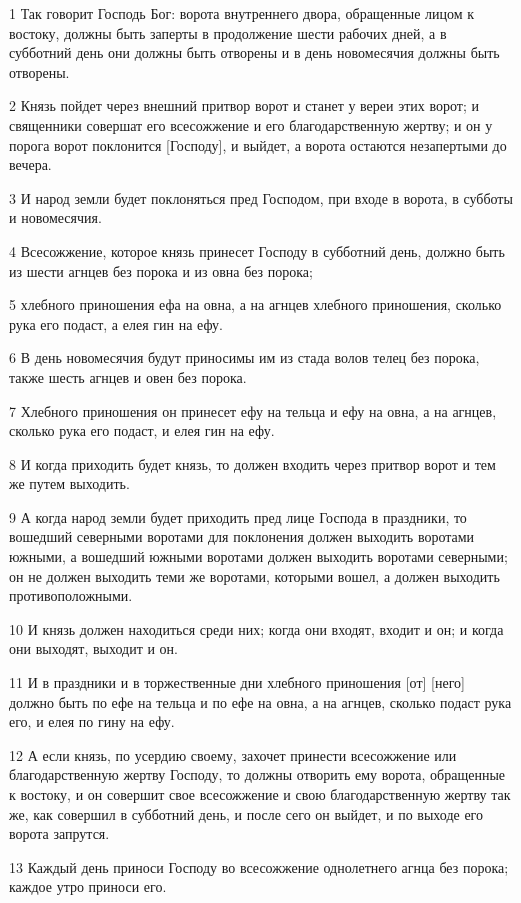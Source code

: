 \par 1 Так говорит Господь Бог: ворота внутреннего двора, обращенные лицом к востоку, должны быть заперты в продолжение шести рабочих дней, а в субботний день они должны быть отворены и в день новомесячия должны быть отворены.
\par 2 Князь пойдет через внешний притвор ворот и станет у вереи этих ворот; и священники совершат его всесожжение и его благодарственную жертву; и он у порога ворот поклонится [Господу], и выйдет, а ворота остаются незапертыми до вечера.
\par 3 И народ земли будет поклоняться пред Господом, при входе в ворота, в субботы и новомесячия.
\par 4 Всесожжение, которое князь принесет Господу в субботний день, должно быть из шести агнцев без порока и из овна без порока;
\par 5 хлебного приношения ефа на овна, а на агнцев хлебного приношения, сколько рука его подаст, а елея гин на ефу.
\par 6 В день новомесячия будут приносимы им из стада волов телец без порока, также шесть агнцев и овен без порока.
\par 7 Хлебного приношения он принесет ефу на тельца и ефу на овна, а на агнцев, сколько рука его подаст, и елея гин на ефу.
\par 8 И когда приходить будет князь, то должен входить через притвор ворот и тем же путем выходить.
\par 9 А когда народ земли будет приходить пред лице Господа в праздники, то вошедший северными воротами для поклонения должен выходить воротами южными, а вошедший южными воротами должен выходить воротами северными; он не должен выходить теми же воротами, которыми вошел, а должен выходить противоположными.
\par 10 И князь должен находиться среди них; когда они входят, входит и он; и когда они выходят, выходит и он.
\par 11 И в праздники и в торжественные дни хлебного приношения [от] [него] должно быть по ефе на тельца и по ефе на овна, а на агнцев, сколько подаст рука его, и елея по гину на ефу.
\par 12 А если князь, по усердию своему, захочет принести всесожжение или благодарственную жертву Господу, то должны отворить ему ворота, обращенные к востоку, и он совершит свое всесожжение и свою благодарственную жертву так же, как совершил в субботний день, и после сего он выйдет, и по выходе его ворота запрутся.
\par 13 Каждый день приноси Господу во всесожжение однолетнего агнца без порока; каждое утро приноси его.

